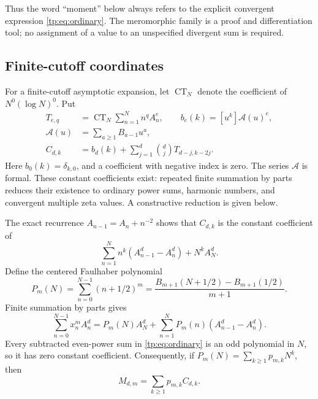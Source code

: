 \documentclass[11pt,a4paper]{article}
\numberwithin{equation}{section}
\theoremstyle{definition}
\theoremstyle{remark}
\DeclareMathOperator{\CT}{CT}
\begin{document}
Thus the word ``moment'' below always refers to the explicit convergent
expression \eqref{tp:eq:ordinary}.  The meromorphic family is a proof
and differentiation tool; no assignment of a value to an unspecified
divergent sum is required.

\subsection{Finite-cutoff coordinates}

For a finite-cutoff asymptotic expansion, let $\CT_N$ denote the coefficient
of $N^0(\log N)^0$.  Put
\begin{equation}\label{tp:eq:TC}
 \begin{split}
 T_{e,q}&=\CT_N\sum_{n=1}^N n^q A_n^e,\qquad
 b_e(k)=[u^k]\mathcal A(u)^e,\\
 \mathcal A(u)&=\sum_{a\geq1}B_{a-1}u^a,\\
 C_{d,k}&=b_d(k)+\sum_{j=1}^d\binom dj T_{d-j,k-2j}.
 \end{split}
\end{equation}
Here $b_0(k)=\delta_{k,0}$, and a coefficient with negative index is
zero.  The series $\mathcal A$ is formal.  These constant coefficients
exist: repeated finite summation by parts reduces their existence to
ordinary power sums, harmonic numbers, and convergent multiple zeta
values.  A constructive reduction is given below.

The exact recurrence
$A_{n-1}=A_n+n^{-2}$ shows that $C_{d,k}$ is the constant coefficient
of
\[
 \sum_{n=1}^N n^k(A_{n-1}^d-A_n^d)+N^kA_N^d.
\]
Define the centered Faulhaber polynomial
\begin{equation}\label{tp:eq:Faulhaber}
 P_m(N)=\sum_{n=0}^{N-1}(n+1/2)^m
 =\frac{B_{m+1}(N+1/2)-B_{m+1}(1/2)}{m+1}.
\end{equation}
Finite summation by parts gives
\begin{equation}\label{tp:eq:finiteSBP}
 \sum_{n=0}^{N-1}x_n^m A_n^d
 =P_m(N)A_N^d+
   \sum_{n=1}^N P_m(n)(A_{n-1}^d-A_n^d).
\end{equation}
Every subtracted even-power sum in \eqref{tp:eq:ordinary} is an odd
polynomial in $N$, so it has zero constant coefficient.  Consequently,
if $P_m(N)=\sum_{k\geq1}p_{m,k}N^k$, then
\begin{equation}\label{tp:eq:momentC}
 M_{d,m}=\sum_{k\geq1}p_{m,k}C_{d,k}.
\end{equation}
\end{document}
